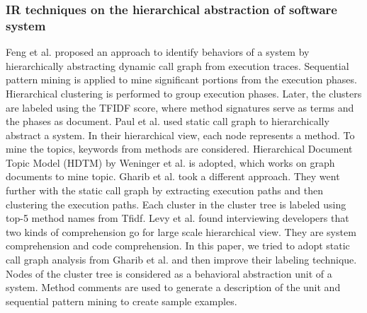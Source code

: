 \subsubsection{IR techniques on the hierarchical abstraction of software system}
Feng et al. \cite{feng2018hierarchicalExecutionComprehension} proposed an approach to identify behaviors of a system by hierarchically abstracting dynamic call graph from execution traces. Sequential pattern mining is applied to mine significant portions from the execution phases. Hierarchical clustering is performed to group execution phases. Later, the clusters are labeled using the TFIDF score, where method signatures serve as terms and the phases as document. 
Paul et al. \cite{mcburney2014improvingTopicSummarize} used static call graph to hierarchically abstract a system. In their hierarchical view, each node represents a method. To mine the topics, keywords from methods are considered. Hierarchical Document Topic Model (HDTM) by \cite{weninger2012documentTopicHierarchies} Weninger et al. is adopted, which works on graph documents to mine topic. Gharib et al. \cite{gharibi2018automaticStaticCluster} took a different approach. They went further with the static call graph by extracting execution paths and then clustering the execution paths. Each cluster in the cluster tree is labeled using top-5 method names from Tfidf. Levy et al. \cite{levy2019understandingLargeHierarchical} found interviewing developers that two kinds of comprehension go for large scale hierarchical view. They are system comprehension and code comprehension. In this paper, we tried to adopt static call graph analysis from Gharib et al. and then improve their labeling technique. Nodes of the cluster tree is considered as a behavioral abstraction unit of a system. Method comments are used to generate a description of the unit and sequential pattern mining to create sample examples. 

